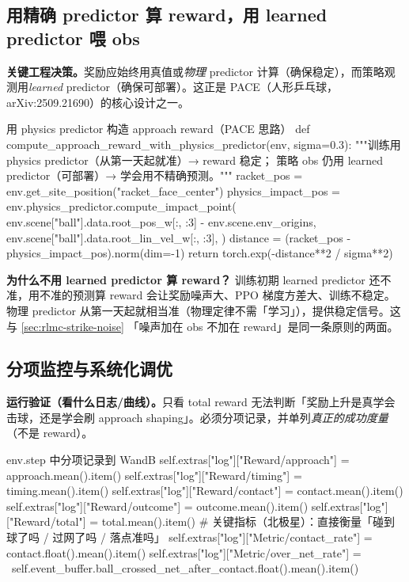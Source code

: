 \subsection{用精确 predictor 算 reward，用 learned predictor 喂 obs}

\textbf{关键工程决策。}奖励应始终用真值或\emph{物理} predictor 计算（确保稳定），而策略观测用\emph{learned} predictor（确保可部署）。这正是 PACE（人形乒乓球，arXiv:2509.21690）的核心设计之一。

\begin{codebox}[Python]{用 physics predictor 构造 approach reward（PACE 思路）}
def compute_approach_reward_with_physics_predictor(env, sigma=0.3):
    """训练用 physics predictor（从第一天起就准）→ reward 稳定；
       策略 obs 仍用 learned predictor（可部署）→ 学会用不精确预测。"""
    racket_pos = env.get_site_position("racket_face_center")
    physics_impact_pos = env.physics_predictor.compute_impact_point(
        env.scene["ball"].data.root_pos_w[:, :3] - env.scene.env_origins,
        env.scene["ball"].data.root_lin_vel_w[:, :3],
    )
    distance = (racket_pos - physics_impact_pos).norm(dim=-1)
    return torch.exp(-distance**2 / sigma**2)
\end{codebox}

\textbf{为什么不用 learned predictor 算 reward？} 训练初期 learned predictor 还不准，用不准的预测算 reward 会让奖励噪声大、PPO 梯度方差大、训练不稳定。物理 predictor 从第一天起就相当准（物理定律不需「学习」），提供稳定信号。这与 \cref{sec:rlmc-strike-noise} 「噪声加在 obs 不加在 reward」是同一条原则的两面。

\subsection{分项监控与系统化调优}

\textbf{运行验证（看什么日志/曲线）。}只看 total reward 无法判断「奖励上升是真学会击球，还是学会刷 approach shaping」。必须分项记录，并单列\emph{真正的成功度量}（不是 reward）。

\begin{codebox}[Python]{env.step 中分项记录到 WandB}
self.extras["log"]["Reward/approach"] = approach.mean().item()
self.extras["log"]["Reward/timing"] = timing.mean().item()
self.extras["log"]["Reward/contact"] = contact.mean().item()
self.extras["log"]["Reward/outcome"] = outcome.mean().item()
self.extras["log"]["Reward/total"] = total.mean().item()
# 关键指标（北极星）：直接衡量「碰到球了吗 / 过网了吗 / 落点准吗」
self.extras["log"]["Metric/contact_rate"] = contact.float().mean().item()
self.extras["log"]["Metric/over_net_rate"] = \
    self.event_buffer.ball_crossed_net_after_contact.float().mean().item()
\end{codebox}

